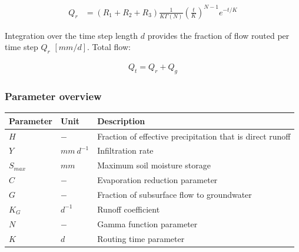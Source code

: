 \begin{align}
 	Q_r &= \left(R_1+R_2+R_3\right)\frac{1}{K\Gamma(N)}\left(\frac{t}{K}\right)^{N-1}e^{-t/K}
\end{align}

Integration over the time step length $d$ provides the fraction of flow routed per time step $Q_r$ $[mm/d]$. Total flow:

\begin{align}
	Q_t = Q_r+Q_g
\end{align}

\newpage
\subsubsection{Parameter overview}
\begin{table}[htbp]
  \centering
    \begin{tabular}{lll}
    \toprule
    Parameter & Unit  & Description \\
    \midrule
    $H$   & $-$   & Fraction of effective precipitation that is direct runoff \\
    $Y$   & $mm~d^{-1}$ & Infiltration rate \\
    $S_{max}$ & $mm$  & Maximum soil moisture storage \\
    $C$   & $-$   & Evaporation reduction parameter \\
    $G$   & $-$   & Fraction of subsurface flow to groundwater \\
    $K_G$ & $d^{-1}$ & Runoff coefficient \\
    $N$   & $-$   & Gamma function parameter \\
    $K$   & $d$   & Routing time parameter \\
    \bottomrule
    \end{tabular}%
  \label{tab:addlabel}%
\end{table}%
